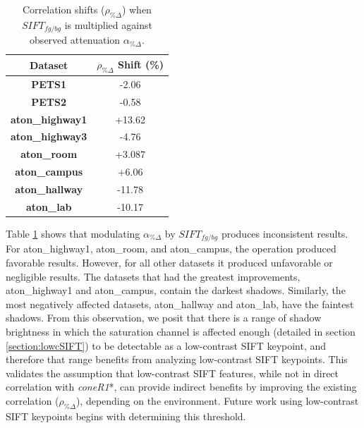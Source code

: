 \begin{table}
\centering
\caption{Correlation shifts ($\rho_{\%\Delta}$) when $SIFT_{fg/bg}$ is multiplied against observed attenuation $\alpha_{\%\Delta}$.}
\begin{tabular}{ |c|c| }
	\hline
	\textbf{Dataset} & $\rho_{\%\Delta}$ Shift (\%)\\
	\hline
	\hline
	\textbf{PETS1} &  -2.06 \\
	\hline
	\textbf{PETS2} & -0.58 \\
	\hline
	\textbf{aton\_highway1} &  +13.62 \\
	\hline
	\textbf{aton\_highway3} & -4.76  \\
	\hline
	\textbf{aton\_room} & +3.087 \\
	\hline
	\textbf{aton\_campus} & +6.06 \\
	\hline
	\textbf{aton\_hallway} & -11.78 \\
	\hline
	\textbf{aton\_lab} & -10.17 \\
	\hline
\end{tabular}

\label{table:corr_diff_sift}
\end{table}

Table \ref{table:corr_diff_sift} shows that modulating $\alpha_{\%\Delta}$ by $SIFT_{fg/bg}$ produces inconsistent results. For aton\_highway1, aton\_room, and aton\_campus, the operation produced favorable results. However, for all other datasets it produced unfavorable or negligible results. The datasets that had the greatest improvements, aton\_highway1 and aton\_campus, contain the darkest shadows. Similarly, the most negatively affected datasets, aton\_hallway and aton\_lab, have the faintest shadows. From this observation, we posit that there is a range of shadow brightness in which the saturation channel is affected enough (detailed in section \ref{section:lowcSIFT}) to be detectable as a low-contrast SIFT keypoint, and therefore that range benefits from analyzing low-contrast SIFT keypoints. This validates the assumption that low-contrast SIFT features, while not in direct correlation with \textit{coneR1}*, can provide indirect benefits by improving the existing correlation ($\rho_{\%\Delta}$), depending on the environment. Future work using low-contrast SIFT keypoints begins with determining this threshold.



